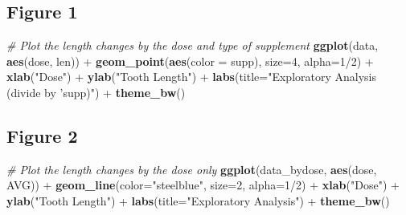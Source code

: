 \documentclass[]{article}
\newenvironment{Shaded}{\begin{snugshade}}{\end{snugshade}}
\newcommand{\KeywordTok}[1]{\textcolor[rgb]{0.13,0.29,0.53}{\textbf{{#1}}}}
\newcommand{\DataTypeTok}[1]{\textcolor[rgb]{0.13,0.29,0.53}{{#1}}}
\newcommand{\DecValTok}[1]{\textcolor[rgb]{0.00,0.00,0.81}{{#1}}}
\newcommand{\StringTok}[1]{\textcolor[rgb]{0.31,0.60,0.02}{{#1}}}
\newcommand{\CommentTok}[1]{\textcolor[rgb]{0.56,0.35,0.01}{\textit{{#1}}}}
\newcommand{\NormalTok}[1]{{#1}}
\begin{document}
\subsection{Figure 1}\label{figure-1}

\begin{Shaded}
\begin{Highlighting}[]
\CommentTok{# Plot the length changes by the dose and type of supplement}
\KeywordTok{ggplot}\NormalTok{(data, }\KeywordTok{aes}\NormalTok{(dose, len)) +}
\StringTok{  }\KeywordTok{geom_point}\NormalTok{(}\KeywordTok{aes}\NormalTok{(}\DataTypeTok{color =} \NormalTok{supp), }\DataTypeTok{size=}\DecValTok{4}\NormalTok{, }\DataTypeTok{alpha=}\DecValTok{1}\NormalTok{/}\DecValTok{2}\NormalTok{) +}
\StringTok{  }\KeywordTok{xlab}\NormalTok{(}\StringTok{"Dose"}\NormalTok{) +}
\StringTok{  }\KeywordTok{ylab}\NormalTok{(}\StringTok{"Tooth Length"}\NormalTok{) +}
\StringTok{  }\KeywordTok{labs}\NormalTok{(}\DataTypeTok{title=}\StringTok{"Exploratory Analysis (divide by 'supp)"}\NormalTok{) +}
\StringTok{  }\KeywordTok{theme_bw}\NormalTok{()}
\end{Highlighting}
\end{Shaded}

\subsection{Figure 2}\label{figure-2}

\begin{Shaded}
\begin{Highlighting}[]
\CommentTok{# Plot the length changes by the dose only}
\KeywordTok{ggplot}\NormalTok{(data_bydose, }\KeywordTok{aes}\NormalTok{(dose, AVG)) +}
\StringTok{  }\KeywordTok{geom_line}\NormalTok{(}\DataTypeTok{color=}\StringTok{"steelblue"}\NormalTok{, }\DataTypeTok{size=}\DecValTok{2}\NormalTok{, }\DataTypeTok{alpha=}\DecValTok{1}\NormalTok{/}\DecValTok{2}\NormalTok{) +}
\StringTok{  }\KeywordTok{xlab}\NormalTok{(}\StringTok{"Dose"}\NormalTok{) +}
\StringTok{  }\KeywordTok{ylab}\NormalTok{(}\StringTok{"Tooth Length"}\NormalTok{) +}
\StringTok{  }\KeywordTok{labs}\NormalTok{(}\DataTypeTok{title=}\StringTok{"Exploratory Analysis"}\NormalTok{) +}
\StringTok{  }\KeywordTok{theme_bw}\NormalTok{()}
\end{Highlighting}
\end{Shaded}
\end{document}

